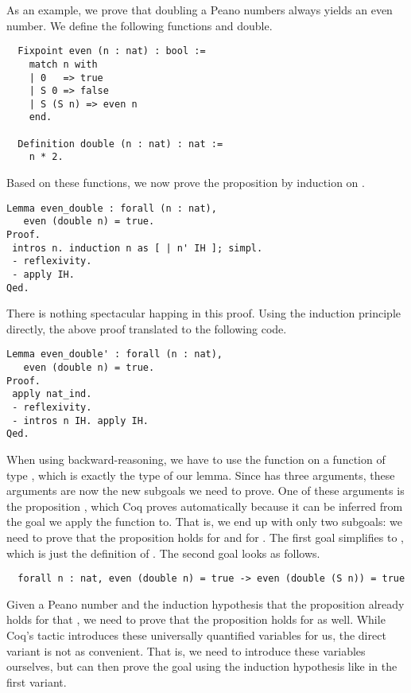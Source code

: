 As an example, we prove that doubling a Peano numbers always yields an even number.
We define the following functions  and {double}.

\begin{verbatim}
  Fixpoint even (n : nat) : bool :=
    match n with
    | 0   => true
    | S 0 => false
    | S (S n) => even n
    end.

  Definition double (n : nat) : nat :=
    n * 2.
\end{verbatim}

Based on these functions, we now prove the proposition by induction on .

\begin{verbatim}
Lemma even_double : forall (n : nat),
   even (double n) = true.
Proof.
 intros n. induction n as [ | n' IH ]; simpl.
 - reflexivity.
 - apply IH.
Qed.
\end{verbatim}

There is nothing spectacular happing in this proof. Using the induction principle directly, the above proof translated to the following code.

\begin{verbatim}
Lemma even_double' : forall (n : nat),
   even (double n) = true.
Proof.
 apply nat_ind.
 - reflexivity.
 - intros n IH. apply IH.
Qed.
\end{verbatim}

When using backward-reasoning, we have to use the function  on a function of type , which is exactly the type of our lemma.
Since  has three arguments, these arguments are now the new subgoals we need to prove.
One of these arguments is the proposition , which Coq proves automatically because it can be inferred from the goal we apply the function to.
That is, we end up with only two subgoals: we need to prove that the proposition holds for  and for .
The first goal simplifies to , which is just the definition of .
The second goal looks as follows.

\begin{verbatim}
  forall n : nat, even (double n) = true -> even (double (S n)) = true
\end{verbatim}

Given a Peano number  and the induction hypothesis that the proposition already holds for that , we need to prove that the proposition holds for  as well.
While Coq's  tactic introduces these universally quantified variables for us, the direct variant is not as convenient.
That is, we need to introduce these variables ourselves, but can then prove the goal using the induction hypothesis like in the first variant.

